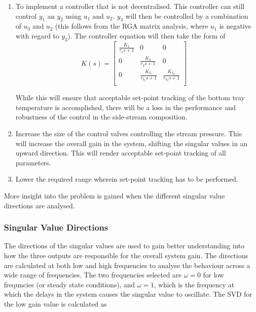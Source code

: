 \begin{enumerate}
	\item To implement a controller that is not decentralised. This controller can still control $y_1$ an $y_2$ using $u_1$ and $u_2$. $y_3$ will then be controlled by a combination of $u_3$ and $u_2$ (this follows from the RGA matrix analysis, where $u_1$ is negative with regard to $y_3$). The controller equation will then take the form of
	\begin{equation}
		K(s) = \begin{bmatrix}
		\frac{K_1}{\tau_1s + 1} & 0 & 0\\
		0 &\frac{K_2}{\tau_2s + 1} & 0\\
		0 & \frac{K_{3_1}}{\tau_{3_1}s + 1} & \frac{K_{3_2}}{\tau_{3_2}s + 1}\\
		\end{bmatrix}
	\end{equation}
	
	While this will ensure that acceptable set-point tracking of the bottom tray temperature is accomplished, there will be a loss in the performance and robustness of the control in the side-stream composition.
	
	\item Increase the size of the control valves controlling the stream pressure. This will increase the overall gain in the system, shifting the singular values in an upward direction. This will render acceptable set-point tracking of all parameters.
	
	\item Lower the required range wherein set-point tracking has to be performed. 
\end{enumerate}

More insight into the problem is gained when the different singular value directions are analysed. 

\subsubsection{Singular Value Directions}

The directions of the singular values are used to gain better understanding into how the three outputs are responsible for the overall system gain. The directions are calculated at both low and high frequencies to analyse the behaviour across a wide range of frequencies. The two frequencies selected are $\omega = 0$ for low frequncies (or steady state conditions), and $\omega = 1$, which is the frequency at which the delays in the system causes the singular value to oscillate. The SVD for the low gain value is calculated as

